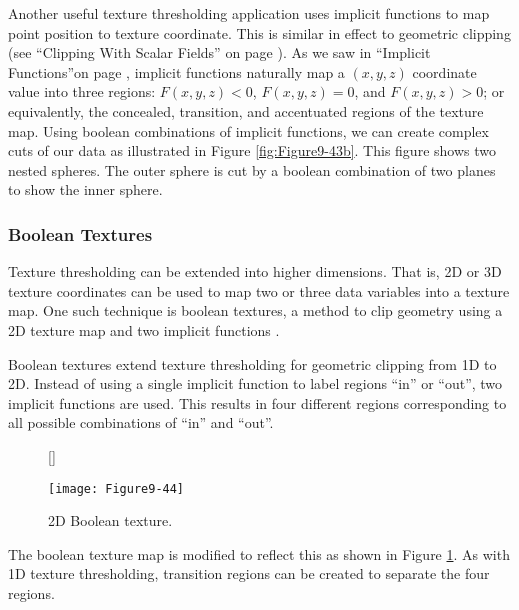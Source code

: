 Another useful texture thresholding application uses implicit functions to map point position to texture coordinate. This is similar in effect to geometric clipping (see ``Clipping With Scalar Fields'' on page \pageref{subsec:clipping_with_scalar_fields}). As we saw in ``Implicit Functions''on page \pageref{subsec:implicit_functions}, implicit functions naturally map a $(x, y, z)$ coordinate value into three regions: $F(x, y, z) < 0$, $F(x, y, z) = 0$, and $F(x, y, z) > 0$; or equivalently, the concealed, transition, and accentuated regions of the texture map. Using boolean combinations of implicit functions, we can create complex cuts of our data as illustrated in Figure \ref{fig:Figure9-43b}. This figure shows two nested spheres. The outer sphere is cut by a boolean combination of two planes to show the inner sphere.

\subsubsection{Boolean Textures}

Texture thresholding can be extended into higher dimensions. That is, 2D or 3D texture coordinates can be used to map two or three data variables into a texture map. One such technique is boolean textures, a method to clip geometry using a 2D texture map and two implicit functions \cite{Lorensen93}.

Boolean textures extend texture thresholding for geometric clipping from 1D to 2D. Instead of using a single implicit function to label regions ``in'' or ``out'', two implicit functions are used. This results in four different regions corresponding to all possible combinations of ``in'' and ``out''.

\begin{figure}[!htb]
	[\FBwidth]
	{\caption{2D Boolean texture.}\label{fig:Figure9-44}}
	{\texttt{[image: Figure9-44]}}
\end{figure}

The boolean texture map is modified to reflect this as shown in Figure  \ref{fig:Figure9-44}. As with 1D texture thresholding, transition regions can be created to separate the four regions.

